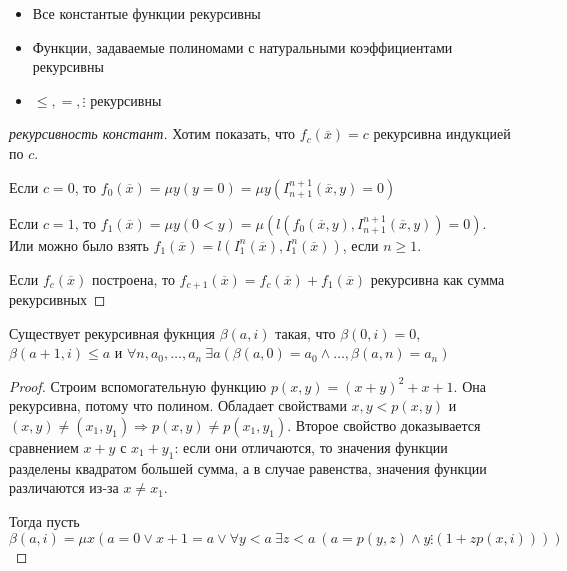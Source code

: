 \begin{exmpl}
    \begin{itemize}\
        \item Все константые функции рекурсивны
        \item Функции, задаваемые полиномами с натуральными коэффициентами рекурсивны
        \item $\le, =, \vdots$ рекурсивны
    \end{itemize}
\end{exmpl}

\begin{proof}[рекурсивность констант]
    Хотим показать, что $f_c (\overline{x}) = c$ рекурсивна индукцией по $c$.

    Если $c=0$, то $f_0 (\overline{x}) = \mu y(y=0) = \mu y (I_{n+1}^{n+1} (\overline{x}, y) =0)$

    Если $c=1$, то $f_1 (\overline{x}) = \mu y (0<y) = \mu (l(f_0 (\overline{x}, y), I_{n+1}^{n+1} (\overline{x}, y))=0)$. Или можно было взять $f_1 (\overline{x}) = l(I_1^n (\overline{x}), I_1^n (\overline{x}) )$, если $n\ge 1$.

    Если $f_c (\overline{x}) $ построена, то $f_{c+1} (\overline{x}) = f_c (\overline{x}) + f_1 (\overline{x}) $ рекурсивна как сумма рекурсивных %
\end{proof}

\begin{prop}
    Существует рекурсивная фукнция $\beta(a, i)$ такая, что $\beta(0, i) = 0$, $\beta(a+1, i)\le a$ и $\forall n, a_0, \ldots, a_n~\exists a (\beta(a, 0)=a_0 \wedge \ldots, \beta(a, n)=a_n)$
\end{prop}

\begin{proof}
    Строим вспомогательную функцию $p(x, y) = (x+y)^2+x+1$. Она рекурсивна, потому что полином. Обладает свойствами $x, y < p(x, y)$ и $(x, y)\ne (x_1, y_1) \Rightarrow p(x, y)\ne p(x_1, y_1)$. Второе свойство доказывается сравнением $x+y$ с $x_1+y_1$: если они отличаются, то значения функции разделены квадратом большей сумма, а в случае равенства, значения функции различаются из-за $x\ne x_1$.

    Тогда пусть $$\beta(a, i)=\mu x (a=0\vee x+1=a \vee \forall y<a~ \exists z<a~(a=p(y, z)\wedge y\vdots(1+zp(x, i))))$$
\end{proof}
